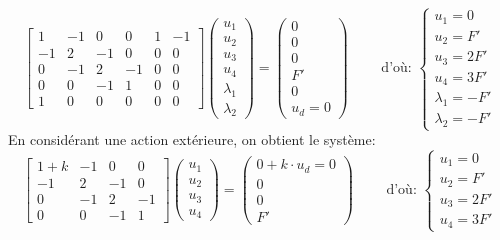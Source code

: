 \begin{equation}
\begin{bmatrix} 1 & -1 & 0 & 0 & 1&-1 \\ -1 & 2 & -1 & 0 & 0&0 \\ 0 & -1 & 2 & -1 & 0&0\\ 0&0&-1&1& 0&0 \\ 1&0&0&0&0&0
\end{bmatrix}
\begin{pmatrix} u_1\\u_2\\u_3\\u_4\\ \lambda_1 \\ \lambda_2 \end{pmatrix}
=
\begin{pmatrix} 0\\0\\0\\F' \\ 0 \\ u_d=0\end{pmatrix}
\qquad \text{ d'où: } 
\left\{\begin{array}{l} u_1=0 \\ u_2=F' \\ u_3=2F' \\ u_4=3F' \\ \lambda_1 = -F' \\ \lambda_2 = -F' \end{array}\right.
\end{equation}
\medskipvm
En considérant une action extérieure, on obtient le système:
\begin{equation}
\begin{bmatrix} 1+k & -1 & 0 & 0 \\ -1 & 2 & -1 & 0 \\ 0 & -1 & 2 & -1\\ 0&0&-1&1
\end{bmatrix}
\begin{pmatrix} u_1\\u_2\\u_3\\u_4 \end{pmatrix}
=
\begin{pmatrix} 0+k\cdot u_d = 0\\0\\0\\F' \end{pmatrix}
\qquad \text{ d'où: } 
\left\{\begin{array}{l} u_1=0 \\ u_2=F' \\ u_3=2F' \\ u_4=3F' \end{array}\right.
\end{equation}


